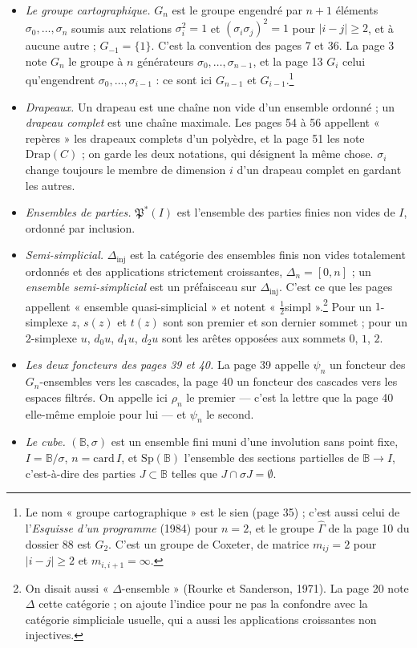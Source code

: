 \documentclass[11pt,a4paper]{article}
\begin{document}
\begin{itemize}
  \item \emph{Le groupe cartographique.} $G_n$ est le groupe engendré par
  $n+1$ éléments $\sigma_0, \ldots, \sigma_n$ soumis aux relations
  $\sigma_i^2 = 1$ et $(\sigma_i\sigma_j)^2 = 1$ pour $|i - j| \geqslant 2$,
  et à aucune autre ; $G_{-1} = \{1\}$. C'est la convention des pages 7 et 36.
  La page 3 note $G_n$ le groupe à $n$ générateurs $\sigma_0, \ldots,
  \sigma_{n-1}$, et la page 13 $G_i$ celui qu'engendrent $\sigma_0, \ldots,
  \sigma_{i-1}$ : ce sont ici $G_{n-1}$ et $G_{i-1}$.\footnote{Le nom
  « groupe cartographique » est le sien (page 35) ; c'est aussi celui de
  l'\emph{Esquisse d'un programme} (1984) pour $n = 2$, et le groupe
  $\widehat{\Gamma}$ de la page 10 du dossier 88 est $G_2$. C'est un groupe de
  Coxeter, de matrice $m_{ij} = 2$ pour $|i - j| \geqslant 2$ et $m_{i,i+1} =
  \infty$.}
  \item \emph{Drapeaux.} Un drapeau est une chaîne non vide d'un ensemble
  ordonné ; un \emph{drapeau complet} est une chaîne maximale. Les pages 54 à
  56 appellent « repères » les drapeaux complets d'un polyèdre, et la page 51
  les note $\mathrm{Drap}(C)$ ; on garde les deux notations, qui désignent la
  même chose. $\sigma_i$ change toujours le membre de dimension $i$ d'un
  drapeau complet en gardant les autres.
  \item \emph{Ensembles de parties.} $\mathfrak{P}^*(I)$ est l'ensemble des
  parties finies non vides de $I$, ordonné par inclusion.
  \item \emph{Semi-simplicial.} $\Delta_{\mathrm{inj}}$ est la catégorie des
  ensembles finis non vides totalement ordonnés et des applications
  strictement croissantes, $\Delta_n = [0, n]$ ; un \emph{ensemble
  semi-simplicial} est un préfaisceau sur $\Delta_{\mathrm{inj}}$. C'est ce que
  les pages appellent « ensemble quasi-simplicial » et notent
  « $\frac{1}{2}$simpl ».\footnote{On disait aussi « $\Delta$-ensemble »
  (Rourke et Sanderson, 1971). La page 20 note $\Delta$ cette catégorie ; on
  ajoute l'indice pour ne pas la confondre avec la catégorie simpliciale
  usuelle, qui a aussi les applications croissantes non injectives.} Pour un
  $1$-simplexe $z$, $s(z)$ et $t(z)$ sont son premier et son dernier sommet ;
  pour un $2$-simplexe $u$, $d_0u$, $d_1u$, $d_2u$ sont les arêtes opposées aux
  sommets $0$, $1$, $2$.
  \item \emph{Les deux foncteurs des pages 39 et 40.} La page 39 appelle
  $\psi_n$ un foncteur des $G_n$-ensembles vers les cascades, la page 40 un
  foncteur des cascades vers les espaces filtrés. On appelle ici $\rho_n$ le
  premier --- c'est la lettre que la page 40 elle-même emploie pour lui ---
  et $\psi_n$ le second.
  \item \emph{Le cube.} $(\mathbb{B}, \sigma)$ est un ensemble fini muni d'une
  involution sans point fixe, $I = \mathbb{B}/\sigma$, $n = \mathrm{card}\, I$,
  et $\mathrm{Sp}(\mathbb{B})$ l'ensemble des sections partielles de
  $\mathbb{B} \to I$, c'est-à-dire des parties $J \subset \mathbb{B}$ telles
  que $J \cap \sigma J = \emptyset$.
\end{itemize}
\end{document}

